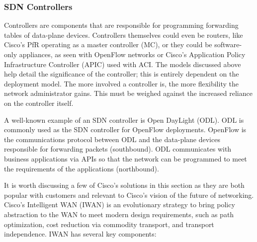 \subsubsection{SDN Controllers}
Controllers are components that are responsible for programming forwarding
tables of data-plane devices. Controllers themselves could even be routers,
like Cisco’s PfR operating as a master controller (MC), or they could be
software-only appliances, as seen with OpenFlow networks or Cisco’s
Application Policy Infrastructure Controller (APIC) used with ACI\@. The models
discussed above help detail the significance of the controller; this is
entirely dependent on the deployment model. The more involved a controller is,
the more flexibility the network administrator gains. This must be weighed
against the increased reliance on the controller itself.

A well-known example of an SDN controller is Open DayLight (ODL). ODL is
commonly used as the SDN controller for OpenFlow deployments. OpenFlow is the
communications protocol between ODL and the data-plane devices responsible for
forwarding packets (southbound). ODL communicates with business applications
via APIs so that the network can be programmed to meet the requirements of the
applications (northbound).

It is worth discussing a few of Cisco’s solutions in this section as they are
both popular with customers and relevant to Cisco’s vision of the future of
networking. Cisco’s Intelligent WAN (IWAN) is an evolutionary strategy to
bring policy abstraction to the WAN to meet modern design requirements, such
as path optimization, cost reduction via commodity transport, and transport
independence. IWAN has several key components:

